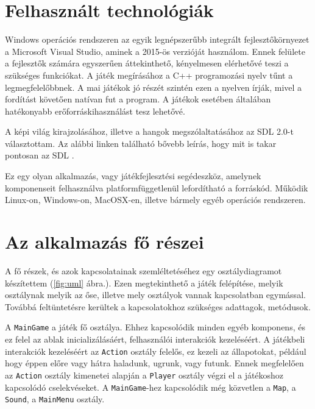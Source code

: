\label{Chap:komponensek}

\section{Felhasznált technológiák}


Windows operációs rendszeren az egyik legnépszerűbb integrált fejlesztőkörnyezet a Microsoft Visual Studio, aminek a 2015-ös verzióját használom. Ennek felülete a fejlesztők számára egyszerűen áttekinthető, kényelmesen elérhetővé teszi a szükséges funkciókat. A játék megírásához a C++ programozási nyelv tűnt a legmegfelelőbbnek. A mai játékok jó részét szintén ezen a nyelven írják, mivel a fordítást követően natívan fut a program. A játékok esetében általában hatékonyabb erőforráskihasználást tesz lehetővé.

A képi világ kirajzolásához, illetve a hangok megszólaltatásához az SDL 2.0-t választottam. Az alábbi linken található bővebb leírás, hogy mit is takar pontosan az SDL \cite{SDL}.

Ez egy olyan alkalmazás, vagy játékfejlesztési segédeszköz, amelynek komponenseit felhasználva platformfüggetlenül lefordítható a forráskód. Működik Linux-on, Windows-on, MacOSX-en, illetve bármely egyéb operációs rendszeren.

\section{Az alkalmazás fő részei}

A fő részek, és azok kapcsolatainak szemléltetéséhez egy osztálydiagramot készítettem (\ref{fig:uml} ábra.). Ezen megtekinthető a játék felépítése, melyik osztálynak melyik az őse, illetve mely osztályok vannak kapcsolatban egymással. Továbbá feltüntetésre kerültek a kapcsolatokhoz szükséges adattagok, metódusok.

A \texttt{MainGame} a játék fő osztálya. Ehhez kapcsolódik minden egyéb komponens, és ez felel az ablak inicializálásáért, felhasználói interakciók kezeléséért. A játékbeli interakciók kezeléséért az \texttt{Action} osztály felelős, ez kezeli az állapotokat, például hogy éppen előre vagy hátra haladunk, ugrunk, vagy futunk. Ennek megfelelően az \texttt{Action} osztály kimenetei alapján a \texttt{Player} osztály végzi el a játékoshoz kapcsolódó cselekvéseket. A \texttt{MainGame}-hez kapcsolódik még közvetlen a \texttt{Map}, a \texttt{Sound}, a \texttt{MainMenu} osztály. 

